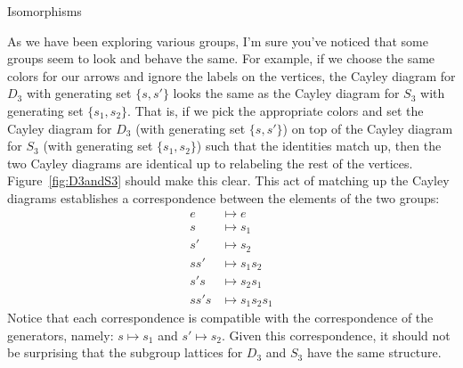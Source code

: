 \begin{section}{Isomorphisms}\label{sec:isomorphisms}


As we have been exploring various groups, I'm sure you've noticed that some groups seem to look and behave the same.  For example, if we choose the same colors for our arrows and ignore the labels on the vertices, the Cayley diagram for $D_3$ with generating set $\{s,s'\}$ looks the same as the Cayley diagram for $S_3$ with generating set $\{s_1, s_2\}$. That is, if we pick the appropriate colors and set the Cayley diagram for $D_3$ (with generating set $\{s,s'\}$) on top of the Cayley diagram for $S_3$ (with generating set $\{s_1, s_2\}$) such that the identities match up, then the two Cayley diagrams are identical up to relabeling the rest of the vertices.  Figure~\ref{fig:D3andS3} should make this clear.  This act of matching up the Cayley diagrams establishes a correspondence between the elements of the two groups:
\begin{align*}
e & \mapsto e\\
s & \mapsto s_1\\
s' &\mapsto s_2\\
ss' &\mapsto s_1s_2\\
s's & \mapsto s_2s_1\\
ss's & \mapsto s_1s_2s_1
\end{align*}
Notice that each correspondence is compatible with the correspondence of the generators, namely: $s \mapsto s_1$ and $s' \mapsto s_2$. Given this correspondence, it should not be surprising that the subgroup lattices for $D_3$ and $S_3$ have the same structure.


\end{section}
